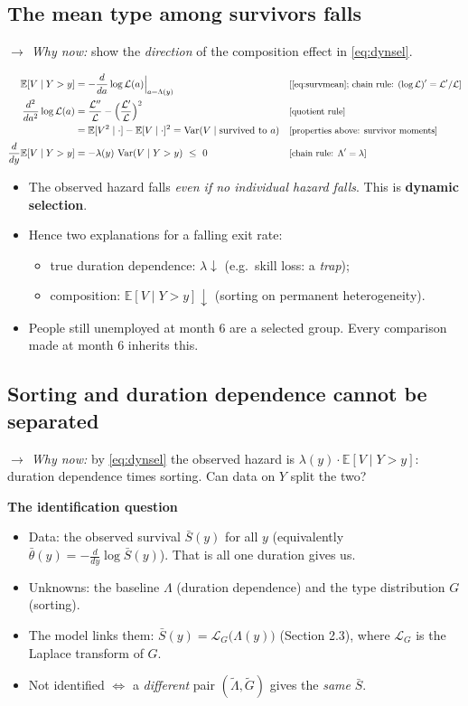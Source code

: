 \documentclass[11pt]{article}
\newcommand{\E}{\mathbb{E}}
\newcommand{\1}{\mathbf{1}}
\newcommand{\Lap}{\mathcal{L}}
\newcommand{\var}{\operatorname{Var}}
\newcommand{\why}[1]{\text{\small[#1]}}
\newcommand{\whynow}[1]{\par\noindent\textit{$\rightarrow$ Why now:} #1\par}
\begin{document}
\subsection{The mean type among survivors falls}
\whynow{show the \emph{direction} of the composition effect in \eqref{eq:dynsel}.}
\begin{align}
  \E[V\mid Y>y] &= -\frac{d}{da}\log\Lap(a)\Big|_{a=\Lambda(y)} && \why{\eqref{eq:survmean}; chain rule: $(\log\Lap)'=\Lap'/\Lap$} \nonumber\\
  \frac{d^2}{da^2}\log\Lap(a) &= \frac{\Lap''}{\Lap}-\Big(\frac{\Lap'}{\Lap}\Big)^2 && \why{quotient rule} \nonumber\\
  &= \E[V^2\mid\cdot]-\E[V\mid\cdot]^2 = \var(V\mid\text{survived to }a) && \why{properties above: survivor moments} \nonumber\\[2pt]
  \frac{d}{dy}\E[V\mid Y>y] &= -\lambda(y)\,\var(V\mid Y>y)\ \le\ 0 && \why{chain rule: $\Lambda'=\lambda$} \nonumber
\end{align}
\begin{itemize}
  \item The observed hazard falls \emph{even if no individual hazard falls}. This is \textbf{dynamic selection}.
  \item Hence two explanations for a falling exit rate:
    \begin{itemize}
      \item true duration dependence: $\lambda\downarrow$ (e.g.\ skill loss: a \emph{trap});
      \item composition: $\E[V\mid Y>y]\downarrow$ (sorting on permanent heterogeneity).
    \end{itemize}
  \item People still unemployed at month 6 are a selected group. Every comparison made at month 6 inherits this.
\end{itemize}

\subsection{Sorting and duration dependence cannot be separated}
\whynow{by \eqref{eq:dynsel} the observed hazard is $\lambda(y)\cdot\E[V\mid Y>y]$: duration dependence times sorting. Can data on $Y$ split the two?}

\textbf{The identification question}
\begin{itemize}
  \item Data: the observed survival $\bar S(y)$ for all $y$ (equivalently $\bar\theta(y)=-\frac{d}{dy}\log\bar S(y)$). That is all one duration gives us.
  \item Unknowns: the baseline $\Lambda$ (duration dependence) and the type distribution $G$ (sorting).
  \item The model links them: $\bar S(y)=\Lap_G\big(\Lambda(y)\big)$ (Section 2.3), where $\Lap_G$ is the Laplace transform of $G$.
  \item Not identified $\iff$ a \emph{different} pair $(\tilde\Lambda,\tilde G)$ gives the \emph{same} $\bar S$.
\end{itemize}
\end{document}
